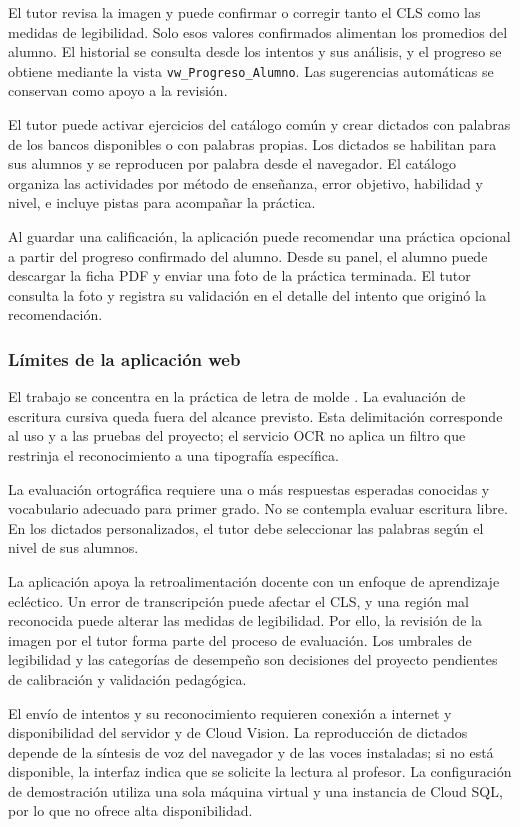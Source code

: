 El tutor revisa la imagen y puede confirmar o corregir tanto el CLS como las medidas de legibilidad. Solo esos valores confirmados alimentan los promedios del alumno. El historial se consulta desde los intentos y sus análisis, y el progreso se obtiene mediante la vista \texttt{vw\_Progreso\_Alumno}. Las sugerencias automáticas se conservan como apoyo a la revisión.

El tutor puede activar ejercicios del catálogo común y crear dictados con palabras de los bancos disponibles o con palabras propias. Los dictados se habilitan para sus alumnos y se reproducen por palabra desde el navegador. El catálogo organiza las actividades por método de enseñanza, error objetivo, habilidad y nivel, e incluye pistas para acompañar la práctica.

Al guardar una calificación, la aplicación puede recomendar una práctica opcional a partir del progreso confirmado del alumno. Desde su panel, el alumno puede descargar la ficha PDF y enviar una foto de la práctica terminada. El tutor consulta la foto y registra su validación en el detalle del intento que originó la recomendación.

\subsubsection{Límites de la aplicación web}

El trabajo se concentra en la práctica de letra de molde \cite{troncoso2009sindrome}. La evaluación de escritura cursiva queda fuera del alcance previsto. Esta delimitación corresponde al uso y a las pruebas del proyecto; el servicio OCR no aplica un filtro que restrinja el reconocimiento a una tipografía específica.

La evaluación ortográfica requiere una o más respuestas esperadas conocidas y vocabulario adecuado para primer grado. No se contempla evaluar escritura libre. En los dictados personalizados, el tutor debe seleccionar las palabras según el nivel de sus alumnos.

La aplicación apoya la retroalimentación docente con un enfoque de aprendizaje ecléctico. Un error de transcripción puede afectar el CLS, y una región mal reconocida puede alterar las medidas de legibilidad. Por ello, la revisión de la imagen por el tutor forma parte del proceso de evaluación. Los umbrales de legibilidad y las categorías de desempeño son decisiones del proyecto pendientes de calibración y validación pedagógica.

El envío de intentos y su reconocimiento requieren conexión a internet y disponibilidad del servidor y de Cloud Vision. La reproducción de dictados depende de la síntesis de voz del navegador y de las voces instaladas; si no está disponible, la interfaz indica que se solicite la lectura al profesor. La configuración de demostración utiliza una sola máquina virtual y una instancia de Cloud SQL, por lo que no ofrece alta disponibilidad.










